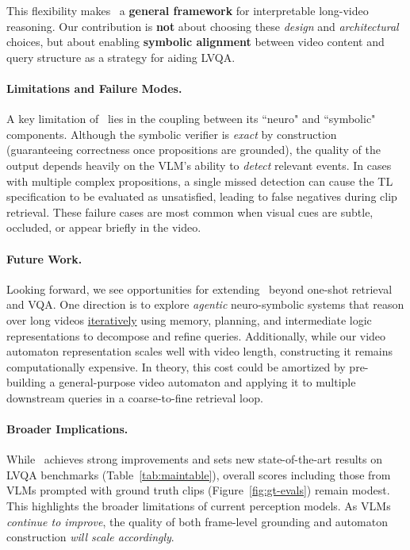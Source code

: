 \documentclass[letterpaper]{article} %
\begin{document}
    This flexibility makes \nsvqa\ a \textbf{general framework} for interpretable long-video reasoning. Our contribution is \textbf{not} about choosing these \textit{design} and \textit{architectural} choices, but about enabling \textbf{symbolic alignment} between video content and query structure as a strategy for aiding LVQA. 

    \paragraph{Limitations and Failure Modes.}
    A key limitation of \nsvqa\ lies in the coupling between its ``neuro" and ``symbolic" components. Although the symbolic verifier is \textit{exact} by construction (guaranteeing correctness once propositions are grounded), the quality of the output depends heavily on the VLM's ability to \textit{detect} relevant events. In cases with multiple complex propositions, a single missed detection can cause the TL specification to be evaluated as unsatisfied, leading to false negatives during clip retrieval. These failure cases are most common when visual cues are subtle, occluded, or appear briefly in the video.

    \paragraph{Future Work.}
    Looking forward, we see opportunities for extending \nsvqa\ beyond one-shot retrieval and VQA. One direction is to explore \textit{agentic} neuro-symbolic systems that reason over long videos \underline{iteratively} using memory, planning, and intermediate logic representations to decompose and refine queries. Additionally, while our video automaton representation scales well with video length, constructing it remains computationally expensive. In theory, this cost could be amortized by pre-building a general-purpose video automaton and applying it to multiple downstream queries in a coarse-to-fine retrieval loop. 

    \paragraph{Broader Implications.}
    While \nsvqa\ achieves strong improvements and sets new state-of-the-art results on LVQA benchmarks (Table~\ref{tab:maintable}), overall scores including those from VLMs prompted with ground truth clips (Figure~\ref{fig:gt-evals}) remain modest. This highlights the broader limitations of current perception models. As VLMs \textit{continue to improve}, the quality of both frame-level grounding and automaton construction \textit{will scale accordingly}.
\end{document}
